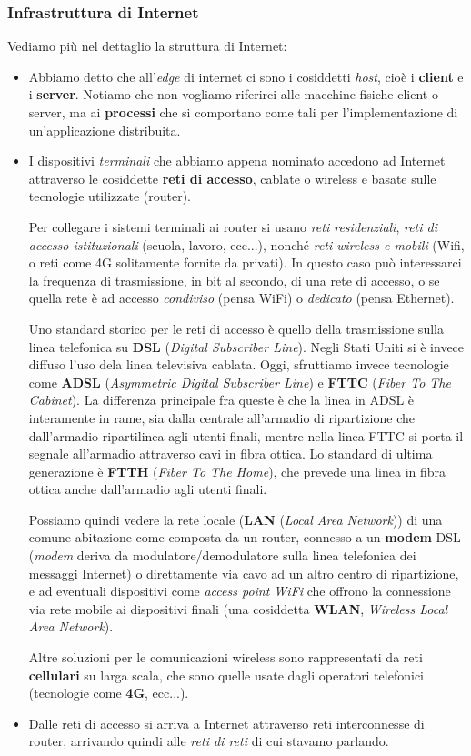 \documentclass[a4paper,11pt]{article}
\begin{document}
\subsubsection{Infrastruttura di Internet}
Vediamo più nel dettaglio la struttura di Internet:
\begin{itemize}
	\item 
	Abbiamo detto che all'\textit{edge} di internet ci sono i cosiddetti \textit{host}, cioè i \textbf{client} e i \textbf{server}. Notiamo che non vogliamo riferirci alle macchine fisiche client o server, ma ai \textbf{processi} che si comportano come tali per l'implementazione di un'applicazione distribuita.
	\item
	I dispositivi \textit{terminali} che abbiamo appena nominato accedono ad Internet attraverso le cosiddette \textbf{reti di accesso}, cablate o wireless e basate sulle tecnologie utilizzate (router).

	Per collegare i sistemi terminali ai router si usano \textit{reti residenziali}, \textit{reti di accesso istituzionali} (scuola, lavoro, ecc...), nonché \textit{reti wireless e mobili} (Wifi, o reti come 4G solitamente fornite da privati).
	In questo caso può interessarci la frequenza di trasmissione, in bit al secondo, di una rete di accesso, o se quella rete è ad accesso \textit{condiviso} (pensa WiFi) o \textit{dedicato} (pensa Ethernet).

	Uno standard storico per le reti di accesso è quello della trasmissione sulla linea telefonica su \textbf{DSL} (\textit{Digital Subscriber Line}).
	Negli Stati Uniti si è invece diffuso l'uso dela linea televisiva cablata.
	Oggi, sfruttiamo invece tecnologie come \textbf{ADSL} (\textit{Asymmetric Digital Subscriber Line}) e \textbf{FTTC} (\textit{Fiber To The Cabinet}).
	La differenza principale fra queste è che la linea in ADSL è interamente in rame, sia dalla centrale all'armadio di ripartizione che dall'armadio ripartilinea agli utenti finali, mentre nella linea FTTC si porta il segnale all'armadio attraverso cavi in fibra ottica.
	Lo standard di ultima generazione è \textbf{FTTH} (\textit{Fiber To The Home}), che prevede una linea in fibra ottica anche dall'armadio agli utenti finali.

	Possiamo quindi vedere la rete locale (\textbf{LAN} (\textit{Local Area Network})) di una comune abitazione come composta da un router, connesso a un \textbf{modem} DSL (\textit{modem} deriva da modulatore/demodulatore sulla linea telefonica dei messaggi Internet) o direttamente via cavo ad un altro centro di ripartizione, e ad eventuali dispositivi come \textit{access point WiFi} che offrono la connessione via rete mobile ai dispositivi finali (una cosiddetta \textbf{WLAN}, \textit{Wireless Local Area Network}).

	Altre soluzioni per le comunicazioni wireless sono rappresentati da reti \textbf{cellulari} su larga scala, che sono quelle usate dagli operatori telefonici (tecnologie come \textbf{4G}, ecc...).

	\item 
	Dalle reti di accesso si arriva a Internet attraverso reti interconnesse di router, arrivando quindi alle \textit{reti di reti} di cui stavamo parlando.
\end{itemize}
\end{document}
